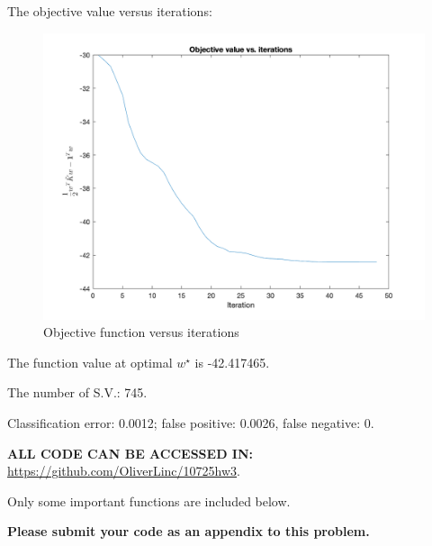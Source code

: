 \documentclass{article}
\theoremstyle{remark}
\theoremstyle{definition}
\begin{document}
\begin{enumerate}[(a)]
\begin{enumerate}[(i)]
{      The objective value versus iterations:
      \begin{figure}
          \centering
          \includegraphics[scale=.4]{obj_barrier.png}
          \caption{Objective function versus iterations}
          \label{fig:my_label}
      \end{figure}
      
      The function value at optimal $w^\star$ is -42.417465.
      
      The number of S.V.: 745.
      
      Classification error: 0.0012; false positive: 0.0026, false negative: 0.
      
      \textbf{ALL CODE CAN BE ACCESSED IN:} \url{https://github.com/OliverLinc/10725hw3}.
      
      Only some important functions are included below.
      }
  \end{enumerate}

\end{enumerate}

\textbf{Please submit your code as an appendix to this problem.}
\end{document}
